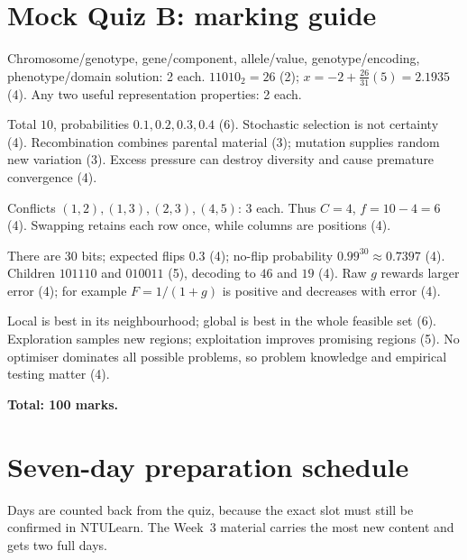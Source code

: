 \documentclass[11pt,a4paper]{article}
\begin{document}
\clearpage
\section{Mock Quiz B: marking guide}
\begin{description}[leftmargin=0pt,labelindent=0pt]
\item[Q1 (20).] Chromosome/genotype, gene/component, allele/value, genotype/encoding, phenotype/domain solution: 2 each. $11010_2=26$ (2); $x=-2+\frac{26}{31}(5)=2.1935$ (4). Any two useful representation properties: 2 each.
\item[Q2 (20).] Total $10$, probabilities $0.1,0.2,0.3,0.4$ (6). Stochastic selection is not certainty (4). Recombination combines parental material (3); mutation supplies random new variation (3). Excess pressure can destroy diversity and cause premature convergence (4).
\item[Q3 (20).] Conflicts $(1,2),(1,3),(2,3),(4,5)$: 3 each. Thus $C=4$, $f=10-4=6$ (4). Swapping retains each row once, while columns are positions (4).
\item[Q4 (25).] There are $30$ bits; expected flips $0.3$ (4); no-flip probability $0.99^{30}\approx0.7397$ (4). Children $101110$ and $010011$ (5), decoding to $46$ and $19$ (4). Raw $g$ rewards larger error (4); for example $F=1/(1+g)$ is positive and decreases with error (4).
\item[Q5 (15).] Local is best in its neighbourhood; global is best in the whole feasible set (6). Exploration samples new regions; exploitation improves promising regions (5). No optimiser dominates all possible problems, so problem knowledge and empirical testing matter (4).
\end{description}
\noindent\textbf{Total: 100 marks.}

\clearpage
\section{Seven-day preparation schedule}
\noindent Days are counted back from the quiz, because the exact slot must
still be confirmed in NTULearn. The Week~3 material carries the most new
content and gets two full days.
\end{document}
